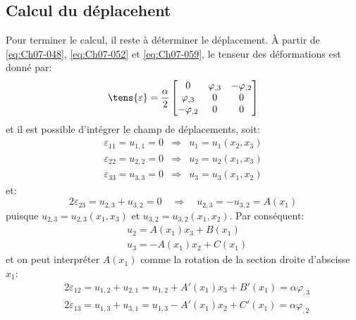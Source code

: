 \subsection{Calcul du déplacehent} \label{ssec:Ch07-2.3}
Pour terminer le calcul, il reste à déterminer le déplacement.
À partir de \eqref{eq:Ch07-048}, \eqref{eq:Ch07-052} et \eqref{eq:Ch07-059}, le tenseur des déformations est donné par:
\begin{equation}
    \tens{\varepsilon} = 
    \frac{\alpha}{2} 
    \begin{bmatrix}
        0 & \varphi_{,3} & -\varphi_{,2} \\
        \varphi_{,3} & 0 & 0 \\
        -\varphi_{,2} & 0 & 0
    \end{bmatrix}
    \label{eq:Ch07-069}
\end{equation}
et il est possible d'intégrer le champ de déplacements, soit:
\begin{equation}
    \begin{aligned}
        \varepsilon_{11} = u_{1,1} = 0 & \Rightarrow & u_1 =u_1 \left( x_2,x_3 \right) \\
        \varepsilon_{22} = u_{2,2} = 0 & \Rightarrow & u_2 =u_2 \left( x_1,x_3 \right) \\
        \varepsilon_{33} = u_{3,3} = 0 & \Rightarrow & u_3 =u_3 \left( x_1,x_2 \right)
    \end{aligned}
    \label{eq:Ch07-070}
\end{equation}
et:
\[
    2\varepsilon_{23} = u_{2,3} + u_{3,2} =0 \quad \Rightarrow \quad u_{2,3} = - u_{3,2} = A(x_1)
\]
puisque $u_{2,3} = u_{2,3}(x_1,x_3)$ et $u_{3,2} = u_{3,2} (x_1,x_2)$. Par conséquent:
\begin{equation}
    \begin{aligned}
        & u_2 = A(x_1) x_3 + B(x_1)\\
        & u_3 = -A(x_1) x_2 + C(x_1)
    \end{aligned}
    \label{eq:Ch07-071} 
\end{equation}
et on peut interpréter $A(x_1)$ comme la rotation de la section droite d'abscisse $x_1$:
\begin{equation}
    \begin{aligned}
        &2\varepsilon_{12} = u_{1,2} + u_{2,1} = u_{1,2} + A'(x_1) x_3 + B'(x_1) = \alpha \varphi_{,3}\\
        &2\varepsilon_{13} = u_{1,3} + u_{3,1} = u_{1,3} - A'(x_1) x_2 + C'(x_1) = \alpha \varphi_{,2}
    \end{aligned}
    \label{eq:Ch07-072}
\end{equation}
